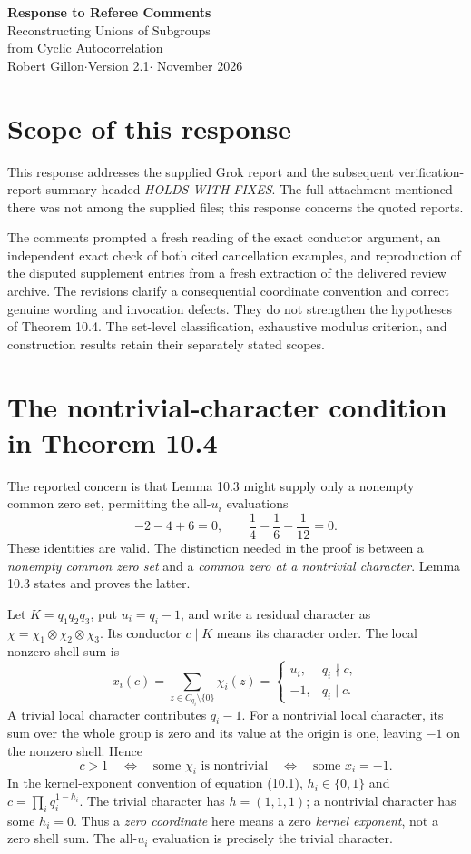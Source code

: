 \documentclass[11pt]{article}
\begin{document}
\begin{center}
{\Large\bfseries Response to Referee Comments}\\[.5em]
{\large Reconstructing Unions of Subgroups\\
from Cyclic Autocorrelation}\\[.4em]
Robert Gillon\quad$\cdot$\quad Version 2.1\quad$\cdot$ November 2026
\end{center}

\section*{Scope of this response}
This response addresses the supplied Grok report and the subsequent
verification-report summary headed \emph{HOLDS WITH FIXES}.
The full attachment mentioned there was not among the supplied files;
this response concerns the quoted reports.

The comments prompted a fresh reading of the exact conductor argument,
an independent exact check of both cited cancellation examples, and
reproduction of the disputed supplement entries from a fresh extraction
of the delivered review archive. The revisions clarify a consequential
coordinate convention and correct genuine wording and invocation defects.
They do not strengthen the hypotheses of Theorem 10.4.
The set-level classification, exhaustive modulus criterion, and
construction results retain their separately stated scopes.

\section{The nontrivial-character condition in Theorem 10.4}
The reported concern is that Lemma 10.3 might supply only a nonempty
common zero set, permitting the all-\(u_i\) evaluations
\[
-2-4+6=0,\qquad
\frac14-\frac16-\frac1{12}=0.
\]
These identities are valid. The distinction needed in the proof is
between a \emph{nonempty common zero set} and a \emph{common zero at a
nontrivial character}. Lemma 10.3 states and proves the latter.

Let \(K=q_1q_2q_3\), put \(u_i=q_i-1\), and write a residual character as
\(\chi=\chi_1\otimes\chi_2\otimes\chi_3\). Its conductor \(c\mid K\)
means its character order. The local nonzero-shell sum is
\[
x_i(c)=\sum_{z\in C_{q_i}\setminus\{0\}}\chi_i(z)
=\begin{cases}
u_i,&q_i\nmid c,\\
-1,&q_i\mid c.
\end{cases}
\]
A trivial local character contributes \(q_i-1\). For a nontrivial
local character, its sum over the whole group is zero and its value at
the origin is one, leaving \(-1\) on the nonzero shell. Hence
\[
c>1\quad\Longleftrightarrow\quad
\text{some }\chi_i\text{ is nontrivial}
\quad\Longleftrightarrow\quad
\text{some }x_i=-1.
\]
In the kernel-exponent convention of equation (10.1), \(h_i\in\{0,1\}\)
and \(c=\prod_iq_i^{1-h_i}\). The trivial character has
\(h=(1,1,1)\); a nontrivial character has some \(h_i=0\).
Thus a \emph{zero coordinate} here means a zero \emph{kernel exponent},
not a zero shell sum. The all-\(u_i\) evaluation is precisely the
trivial character.
\end{document}
